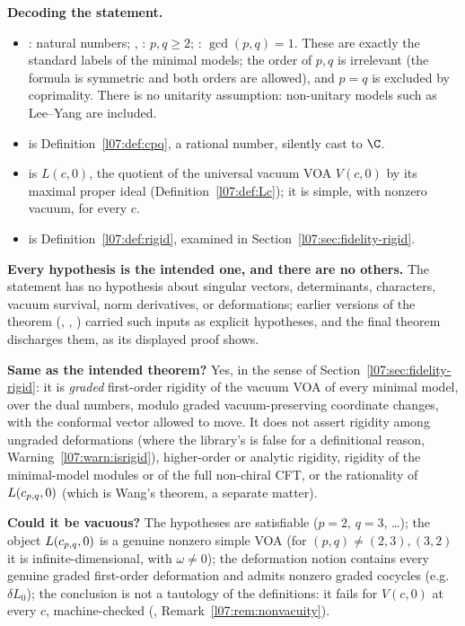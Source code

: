 \begin{dictionary}
\textbf{Decoding the statement.}
\begin{itemize}
\item {}: natural numbers; , : $p,q\ge2$; :
  $\gcd(p,q) = 1$. These are exactly the standard labels of the minimal models; the order of $p,q$ is
  irrelevant (the formula is symmetric and both orders are allowed), and $p = q$ is excluded by coprimality.
  There is no unitarity assumption: non-unitary models such as Lee--Yang are included.
\item {} is Definition~\ref{l07:def:cpq}, a rational number, silently cast to
  $\C$.
\item {} is $L(c,0)$, the quotient of the universal vacuum VOA $V(c,0)$ by its maximal
  proper ideal (Definition~\ref{l07:def:Lc}); it is simple, with nonzero vacuum, for every $c$.
\item {} is Definition~\ref{l07:def:rigid}, examined in Section~\ref{l07:sec:fidelity-rigid}.
\end{itemize}

\textbf{Every hypothesis is the intended one, and there are no others.} The statement has no hypothesis about
singular vectors, determinants, characters, vacuum survival, norm derivatives, or deformations; earlier
versions of the theorem (, ,
) carried such inputs as explicit hypotheses, and the final
theorem discharges them, as its displayed proof shows.

\textbf{Same as the intended theorem?} Yes, in the sense of Section~\ref{l07:sec:fidelity-rigid}: it is
\emph{graded} first-order rigidity of the vacuum VOA of every minimal model, over the dual numbers, modulo
graded vacuum-preserving coordinate changes, with the conformal vector allowed to move. It does not assert
rigidity among ungraded deformations (where the library's  is false for a definitional reason,
Warning~\ref{l07:warn:isrigid}), higher-order or analytic rigidity, rigidity of the minimal-model modules or
of the full non-chiral CFT, or the rationality of $L(c_{p,q},0)$ (which is Wang's theorem, a separate matter).

\textbf{Could it be vacuous?} The hypotheses are satisfiable ($p = 2$, $q = 3$, \dots); the object
$L(c_{p,q},0)$ is a genuine nonzero simple VOA (for $(p,q)\ne(2,3),(3,2)$ it is infinite-dimensional, with
$\omega\neq0$); the deformation notion contains every genuine graded first-order deformation and admits nonzero
graded cocycles (e.g.\ $\delta L_0$); the conclusion is not a tautology of the definitions: it fails for
$V(c,0)$ at every $c$, machine-checked (\allowbreak{}\allowbreak{}\allowbreak{}\allowbreak{}, Remark~\ref{l07:rem:nonvacuity}).


\end{dictionary}
